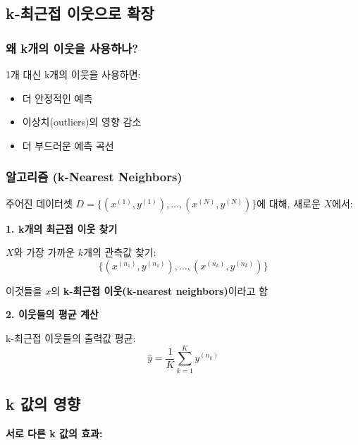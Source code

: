 \documentclass[12pt,a4paper]{article}
\begin{document}
\subsection{k-최근접 이웃으로 확장}

\subsubsection{왜 k개의 이웃을 사용하나?}

1개 대신 k개의 이웃을 사용하면:
\begin{itemize}
    \item 더 안정적인 예측
    \item 이상치(outliers)의 영향 감소
    \item 더 부드러운 예측 곡선
\end{itemize}

\subsubsection{알고리즘 (k-Nearest Neighbors)}

주어진 데이터셋 $D = \{(x^{(1)}, y^{(1)}), \ldots, (x^{(N)}, y^{(N)})\}$에 대해,
새로운 $X$에서:

\textbf{1. k개의 최근접 이웃 찾기}

$X$와 가장 가까운 $k$개의 관측값 찾기:
\begin{equation}
\{(x^{(n_1)}, y^{(n_1)}), \ldots, (x^{(n_k)}, y^{(n_k)})\}
\end{equation}

이것들을 $x$의 \textbf{k-최근접 이웃(k-nearest neighbors)}이라고 함

\textbf{2. 이웃들의 평균 계산}

k-최근접 이웃들의 출력값 평균:
\begin{equation}
\hat{y} = \frac{1}{K}\sum_{k=1}^{K}y^{(n_k)}
\end{equation}

\subsection{k 값의 영향}

\textbf{서로 다른 k 값의 효과:}
\end{document}
